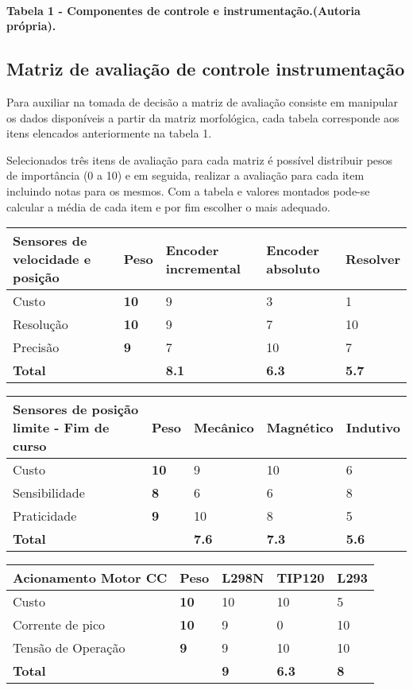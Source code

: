 \documentclass[]{article}
\let\oldparagraph\paragraph
\renewcommand{\paragraph}[1]{\oldparagraph{#1}\mbox{}}
\begin{document}
\paragraph{Tabela 1 - Componentes de controle e instrumentação.(Autoria
própria).}\label{tabela-1---componentes-de-controle-e-instrumentauxe7uxe3o.autoria-pruxf3pria.}

\subsection{Matriz de avaliação de controle
instrumentação}\label{matriz-de-avaliauxe7uxe3o-de-controle-instrumentauxe7uxe3o}

Para auxiliar na tomada de decisão a matriz de avaliação consiste em
manipular os dados disponíveis a partir da matriz morfológica, cada
tabela corresponde aos itens elencados anteriormente na tabela 1.

Selecionados três itens de avaliação para cada matriz é possível
distribuir pesos de importância (0 a 10) e em seguida, realizar a
avaliação para cada item incluindo notas para os mesmos. Com a tabela e
valores montados pode-se calcular a média de cada item e por fim
escolher o mais adequado.

\begin{longtable}[]{@{}lllll@{}}
\toprule
\textbf{Sensores de velocidade e posição} & \textbf{Peso} &
\textbf{Encoder incremental} & \textbf{Encoder absoluto} &
\textbf{Resolver}\tabularnewline
\midrule
\endhead
Custo & \textbf{10} & 9 & 3 & 1\tabularnewline
Resolução & \textbf{10} & 9 & 7 & 10\tabularnewline
Precisão & \textbf{9} & 7 & 10 & 7\tabularnewline
\textbf{Total} & & \textbf{8.1} & \textbf{6.3} &
\textbf{5.7}\tabularnewline
\bottomrule
\end{longtable}

\begin{longtable}[]{@{}lllll@{}}
\toprule
\textbf{Sensores de posição limite - Fim de curso} & \textbf{Peso} &
\textbf{Mecânico} & \textbf{Magnético} &
\textbf{Indutivo}\tabularnewline
\midrule
\endhead
Custo & \textbf{10} & 9 & 10 & 6\tabularnewline
Sensibilidade & \textbf{8} & 6 & 6 & 8\tabularnewline
Praticidade & \textbf{9} & 10 & 8 & 5\tabularnewline
\textbf{Total} & & \textbf{7.6} & \textbf{7.3} &
\textbf{5.6}\tabularnewline
\bottomrule
\end{longtable}

\begin{longtable}[]{@{}lllll@{}}
\toprule
\textbf{Acionamento Motor CC} & \textbf{Peso} & \textbf{L298N} &
\textbf{TIP120} & \textbf{L293}\tabularnewline
\midrule
\endhead
Custo & \textbf{10} & 10 & 10 & 5\tabularnewline
Corrente de pico & \textbf{10} & 9 & 0 & 10\tabularnewline
Tensão de Operação & \textbf{9} & 9 & 10 & 10\tabularnewline
\textbf{Total} & & \textbf{9} & \textbf{6.3} & \textbf{8}\tabularnewline
\bottomrule
\end{longtable}
\end{document}
